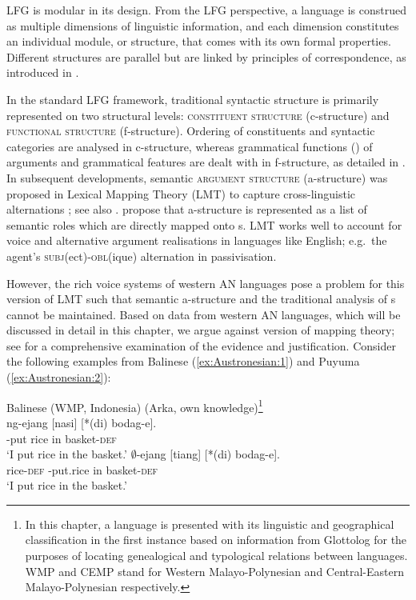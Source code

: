 \documentclass[output=paper,chinesefont]{../langscibook}
\begin{document}
LFG is modular in its design. From the LFG perspective, a language is construed as multiple dimensions of linguistic information, and each dimension constitutes an individual module, or structure, that comes with its own formal properties. Different structures are parallel but are linked by principles of correspondence, as introduced in . 

In the standard LFG framework, traditional syntactic structure is primarily represented on two structural levels: \textsc{constituent structure} (c-structure) and \textsc{functional structure} (f-structure). Ordering of constituents and syntactic categories are analysed in c-structure, whereas grammatical functions () of arguments and grammatical features are dealt with in f-structure, as detailed in . In subsequent developments, semantic \textsc{argument structure} (a-structure) was proposed in Lexical Mapping Theory (LMT) to capture cross-linguistic \GF alternations \citep{bresnan1989locative}; see also . \citet{bresnan1989locative} propose that a-structure is represented as a list of semantic roles which are directly mapped onto {\GF}s.  LMT works well to account for voice and alternative argument realisations in languages like English; e.g.\ the agent's \textsc{subj}(ect)-\textsc{obl}(ique) alternation in passivisation.

However, the rich voice systems of western AN languages pose a problem for this version of LMT such that semantic a-structure and the traditional analysis of {\GF}s cannot be maintained.  Based on data from western AN languages, which will be discussed in detail in this chapter, we argue against  version of mapping theory; see \citet[119--124]{arka2003} for a comprehensive examination of the evidence and justification.  Consider the following examples from Balinese (\ref{ex:Austronesian:1}) and Puyuma (\ref{ex:Austronesian:2}):

\ea\label{ex:Austronesian:1} Balinese (WMP, Indonesia) (Arka, own knowledge)\footnote{In this chapter, a language is presented with its linguistic and geographical classification in the first instance based on information from Glottolog for the purposes of locating genealogical and typological relations between languages. WMP and CEMP stand for Western Malayo-Polynesian and Central-Eastern Malayo-Polynesian respectively.}\\
\ea\gll
[Tiang]\textsubscript{\SUBJ} ng-ejang [nasi]\textsubscript{\OBJ} [*(di) bodag-e]\textsubscript{}.\\
\phantom{[}{1\SG} \AV-put \phantom{[}rice \hspace*{1em}in basket-\textsc{def}\\
\glt `I put rice in the basket.'
\ex\gll
[Nasi-ne]\textsubscript{\SUBJ} $\emptyset$-ejang [tiang]\textsubscript{\OBJ} [*(di) bodag-e]\textsubscript{}.\\
\phantom{[}rice-\textsc{def} \UV-put.rice \phantom{[}{1\SG}  \hspace*{1em}in basket-\textsc{def}\\
\glt`I put rice in the basket.'
\z\z
\end{document}
